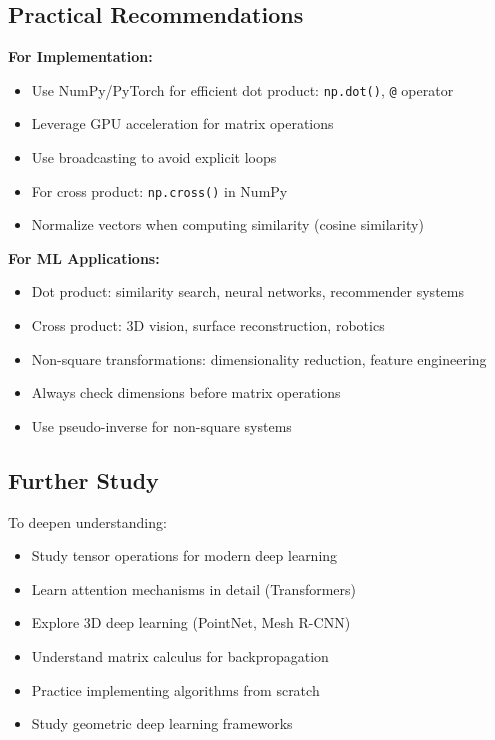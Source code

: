 \documentclass[12pt,a4paper]{article}
\theoremstyle{definition}
\begin{document}
\subsection{Practical Recommendations}

\begin{tcolorbox}[enhanced,breakable,colback=green!5!white,colframe=green!75!black,title=Best Practices]

\textbf{For Implementation:}
\begin{itemize}
    \item Use NumPy/PyTorch for efficient dot product: \texttt{np.dot()}, \texttt{@} operator
    \item Leverage GPU acceleration for matrix operations
    \item Use broadcasting to avoid explicit loops
    \item For cross product: \texttt{np.cross()} in NumPy
    \item Normalize vectors when computing similarity (cosine similarity)
\end{itemize}

\textbf{For ML Applications:}
\begin{itemize}
    \item Dot product: similarity search, neural networks, recommender systems
    \item Cross product: 3D vision, surface reconstruction, robotics
    \item Non-square transformations: dimensionality reduction, feature engineering
    \item Always check dimensions before matrix operations
    \item Use pseudo-inverse for non-square systems
\end{itemize}
\end{tcolorbox}

\subsection{Further Study}

To deepen understanding:
\begin{itemize}
    \item Study tensor operations for modern deep learning
    \item Learn attention mechanisms in detail (Transformers)
    \item Explore 3D deep learning (PointNet, Mesh R-CNN)
    \item Understand matrix calculus for backpropagation
    \item Practice implementing algorithms from scratch
    \item Study geometric deep learning frameworks
\end{itemize}
\end{document}
